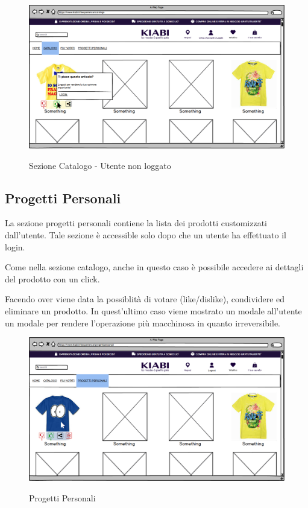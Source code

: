 \documentclass[12pt,italian,]{report}
\begin{document}
\begin{figure}[h]
\centering
\includegraphics{balsamiq/Catalogo login.png}
\label{catalogo_non_loggato}
\caption{Sezione Catalogo - Utente non loggato}
\end{figure}

\subsection{Progetti Personali} 

La sezione progetti personali contiene la lista dei prodotti customizzati dall'utente. Tale sezione è accessible solo dopo che un utente ha effettuato il login.

Come nella sezione catalogo, anche in questo caso è possibile accedere ai dettagli del prodotto con un click.

Facendo over viene data la possiblità di votare (like/dislike), condividere ed eliminare un prodotto. In quest'ultimo caso viene mostrato un modale all'utente un modale per rendere l'operazione più macchinosa in quanto irreversibile.

\begin{figure}[h]
\centering
\includegraphics{balsamiq/Progetti Personali.png}
\label{progetti_personali}
\caption{Progetti Personali}
\end{figure}
\end{document}
